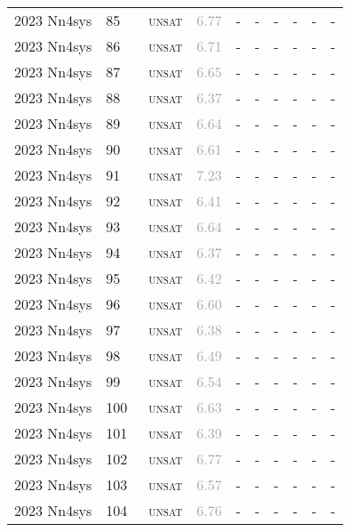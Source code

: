 \begin{center}
{\begin{longtable}{@{}llllllllll@{}}
2023 Nn4sys & 85 & ~\textsc{unsat} & \textcolor{darkgray}{6.77} & - & - & - & - & - & - \\
2023 Nn4sys & 86 & ~\textsc{unsat} & \textcolor{darkgray}{6.71} & - & - & - & - & - & - \\
2023 Nn4sys & 87 & ~\textsc{unsat} & \textcolor{darkgray}{6.65} & - & - & - & - & - & - \\
2023 Nn4sys & 88 & ~\textsc{unsat} & \textcolor{darkgray}{6.37} & - & - & - & - & - & - \\
2023 Nn4sys & 89 & ~\textsc{unsat} & \textcolor{darkgray}{6.64} & - & - & - & - & - & - \\
2023 Nn4sys & 90 & ~\textsc{unsat} & \textcolor{darkgray}{6.61} & - & - & - & - & - & - \\
2023 Nn4sys & 91 & ~\textsc{unsat} & \textcolor{darkgray}{7.23} & - & - & - & - & - & - \\
2023 Nn4sys & 92 & ~\textsc{unsat} & \textcolor{darkgray}{6.41} & - & - & - & - & - & - \\
2023 Nn4sys & 93 & ~\textsc{unsat} & \textcolor{darkgray}{6.64} & - & - & - & - & - & - \\
2023 Nn4sys & 94 & ~\textsc{unsat} & \textcolor{darkgray}{6.37} & - & - & - & - & - & - \\
2023 Nn4sys & 95 & ~\textsc{unsat} & \textcolor{darkgray}{6.42} & - & - & - & - & - & - \\
2023 Nn4sys & 96 & ~\textsc{unsat} & \textcolor{darkgray}{6.60} & - & - & - & - & - & - \\
2023 Nn4sys & 97 & ~\textsc{unsat} & \textcolor{darkgray}{6.38} & - & - & - & - & - & - \\
2023 Nn4sys & 98 & ~\textsc{unsat} & \textcolor{darkgray}{6.49} & - & - & - & - & - & - \\
2023 Nn4sys & 99 & ~\textsc{unsat} & \textcolor{darkgray}{6.54} & - & - & - & - & - & - \\
2023 Nn4sys & 100 & ~\textsc{unsat} & \textcolor{darkgray}{6.63} & - & - & - & - & - & - \\
2023 Nn4sys & 101 & ~\textsc{unsat} & \textcolor{darkgray}{6.39} & - & - & - & - & - & - \\
2023 Nn4sys & 102 & ~\textsc{unsat} & \textcolor{darkgray}{6.77} & - & - & - & - & - & - \\
2023 Nn4sys & 103 & ~\textsc{unsat} & \textcolor{darkgray}{6.57} & - & - & - & - & - & - \\
2023 Nn4sys & 104 & ~\textsc{unsat} & \textcolor{darkgray}{6.76} & - & - & - & - & - & - \\

\end{longtable}}
\end{center}
